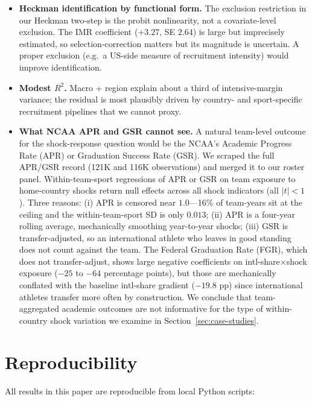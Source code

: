 \documentclass[11pt]{article}
\begin{document}
\begin{itemize}
\item \textbf{Heckman identification by functional form.} The
exclusion restriction in our Heckman two-step is the probit
nonlinearity, not a covariate-level exclusion. The IMR coefficient
($+3.27$, SE $2.64$) is large but imprecisely estimated, so
selection-correction matters but its magnitude is uncertain. A
proper exclusion (e.g.\ a US-side measure of recruitment intensity)
would improve identification.

\item \textbf{Modest $R^2$.} Macro + region explain about a third of
intensive-margin variance; the residual is most plausibly driven by
country- and sport-specific recruitment pipelines that we cannot
proxy.

\item \textbf{What NCAA APR and GSR cannot see.} A natural team-level
outcome for the shock-response question would be the NCAA's Academic
Progress Rate (APR) or Graduation Success Rate (GSR). We scraped
the full APR/GSR record (121K and 116K observations) and merged it
to our roster panel. Within-team-sport regressions of APR or GSR on
team exposure to home-country shocks return null effects across all
shock indicators (all $|t|<1$). Three reasons: (i) APR is censored
near $1.0$---16\% of team-years sit at the ceiling and the
within-team-sport SD is only $0.013$; (ii) APR is a four-year
rolling average, mechanically smoothing year-to-year shocks; (iii)
GSR is transfer-adjusted, so an international athlete who leaves in
good standing does not count against the team. The Federal
Graduation Rate (FGR), which does not transfer-adjust, shows large
negative coefficients on intl-share$\times$shock exposure
($-25$ to $-64$ percentage points), but those are mechanically
conflated with the baseline intl-share gradient ($-19.8$ pp) since
international athletes transfer more often by construction. We
conclude that team-aggregated academic outcomes are not informative
for the type of within-country shock variation we examine in
Section~\ref{sec:case-studies}.
\end{itemize}

\section{Reproducibility}

All results in this paper are reproducible from local Python scripts:
\end{document}

